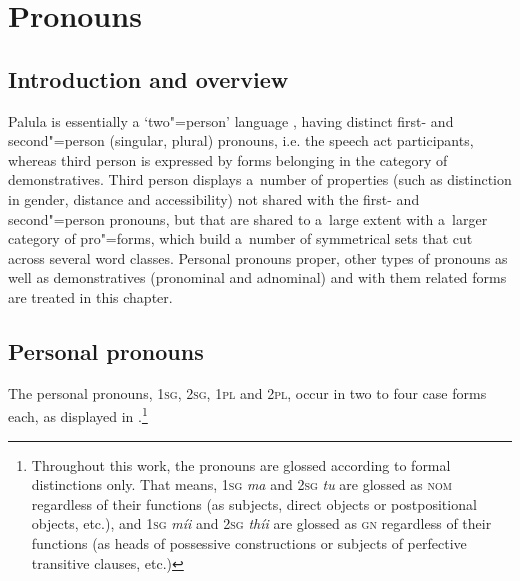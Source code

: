 \chapter{Pronouns}
\label{chap:5}

\section{Introduction and overview}
\label{sec:5-1}


Palula is essentially a `two"=person' language \citep[4--15]{bhat2004}, having distinct first- and second"=person (singular, plural) pronouns, i.e. the speech act participants, whereas third person is expressed by forms belonging in the category of demonstratives. Third person displays a~number of properties (such as distinction in gender, distance and accessibility) not shared with the first- and second"=person pronouns, but that are shared to a~large extent with a~larger category of pro"=forms, which build a~number of symmetrical sets that cut across several word classes. Personal pronouns proper, other types of pronouns as well as demonstratives (pronominal and adnominal) and with them related forms are treated in this chapter.


\section{Personal pronouns}
\label{sec:5-2}

The personal pronouns, \textsc{1sg}, \textsc{2sg}, \textsc{1pl} and \textsc{2pl}, occur in two to four case forms each, as displayed in .\footnote{Throughout this work, the pronouns are glossed according to formal distinctions only. That means, \textsc{1sg} \textit{ma} and \textsc{2sg} \textit{tu} are glossed as \textsc{nom} regardless of their functions (as subjects, direct objects or postpositional objects, etc.), and \textsc{1sg} \textit{míi} and \textsc{2sg} \textit{thíi} are glossed as \textsc{gn} regardless of their functions (as heads of possessive constructions or subjects of perfective transitive clauses, etc.)} 

